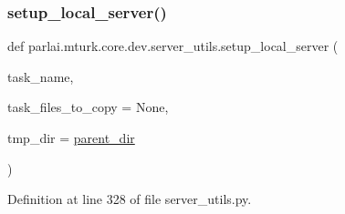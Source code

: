 \subsubsection{\texorpdfstring{setup\+\_\+local\+\_\+server()}{setup\_local\_server()}}
{\footnotesize\ttfamily def parlai.\+mturk.\+core.\+dev.\+server\+\_\+utils.\+setup\+\_\+local\+\_\+server (\begin{DoxyParamCaption}\item[{}]{task\+\_\+name,  }\item[{}]{task\+\_\+files\+\_\+to\+\_\+copy = {\ttfamily None},  }\item[{}]{tmp\+\_\+dir = {\ttfamily \hyperlink{namespaceparlai_1_1mturk_1_1core_1_1dev_1_1server__utils_a432ae14c0d872fbfebe4d9b7d73d13b9}{parent\+\_\+dir}} }\end{DoxyParamCaption})}



Definition at line 328 of file server\+\_\+utils.\+py.


